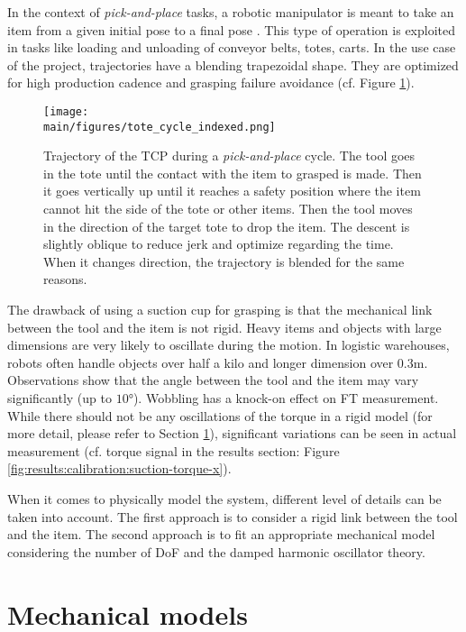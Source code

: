 \documentclass[/home/francois/latex/report/main.tex]{subfiles}
\begin{document}
In the context of \textit{pick-and-place} tasks, a robotic manipulator is meant to
take an item from a given initial pose to a final pose \cite{Angeles2006}. This type of operation is exploited in tasks like loading and unloading of conveyor belts, totes, carts. In the use case of the project, trajectories have a blending trapezoidal shape. They are optimized for high production cadence and grasping failure avoidance (cf. Figure \ref{fig:background:tote_cycle}).

\begin{figure}[h]
  \centering
  \texttt{[image: \\main/figures/tote\_cycle\_indexed.png]}
  \caption{Trajectory of the \ac{TCP} during a \textit{pick-and-place} cycle. The tool goes in the tote until the contact with the item to grasped is made. Then it goes vertically up until it reaches a safety position where the item cannot hit the side of the tote or other items. Then the tool moves in the direction of the target tote to drop the item. The descent is slightly oblique to reduce jerk and optimize regarding the time. When it changes direction, the trajectory is blended for the same reasons.}
  \label{fig:background:tote_cycle}
\end{figure}

The drawback of using a suction cup for grasping is that the mechanical link between the tool and the item is not rigid. Heavy items and objects with large dimensions are very likely to oscillate during the motion. In logistic warehouses, robots often handle objects over half a kilo and longer dimension over $0.3 \si{\meter}$. Observations show that the angle between the tool and the item may vary significantly (up to $10 \si{\degree}$). Wobbling has a knock-on effect on \ac{FT} measurement. While there should not be any oscillations of the torque in a rigid model (for more detail, please refer to Section \ref{section:mechanical-models}), significant variations can be seen in actual measurement (cf. torque signal in the results section:   Figure \ref{fig:results:calibration:suction-torque-x}).

When it comes to physically model the system, different level of details can be taken into account. The first approach is to consider a rigid link between the tool and the item. The second approach is to fit an appropriate mechanical model considering the number of \ac{DoF} and the damped harmonic oscillator theory.

\section{Mechanical models}
\label{section:mechanical-models}
\end{document}
